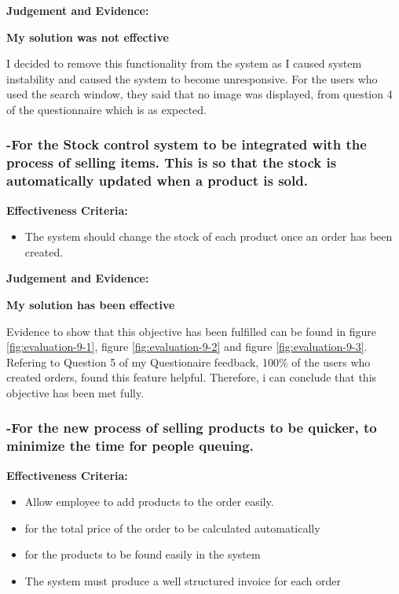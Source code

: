 \textbf{Judgement and Evidence:} \newline

\textbf{\large{My solution was not effective}}

I decided to remove this functionality from the system as I caused system instability and caused the system to become unresponsive. For the users who used the search window, they said that no image was displayed, from question 4 of the questionnaire which is as expected. 




\pagebreak
\subsubsection{-For the Stock control system to be integrated with the process of selling items. This is so that the stock is automatically updated when a product is sold.}
\label{stock-change-effectiveness}
\textbf{Effectiveness Criteria:}\newline
\begin{itemize}
	\item{The system should change the stock of each product once an order has been created.}
\end{itemize}

\textbf{Judgement and Evidence:} \newline

\textbf{\large{My solution has been effective}}

Evidence to show that this objective has been fulfilled can be found in figure \ref{fig:evaluation-9-1}, figure \ref{fig:evaluation-9-2} and figure \ref{fig:evaluation-9-3}. Refering to Question 5 of my Questionaire feedback, 100\% of the users who created orders, found this feature helpful. Therefore, i can conclude that this objective has been met fully.




\pagebreak
\subsubsection{-For the new process of selling products to be quicker, to minimize the time for people queuing.}

\textbf{Effectiveness Criteria:}\newline
\begin{itemize}
	\item{Allow employee to add products to the order easily.}
	\item{for the total price of the order to be calculated automatically}
	\item{for the products to be found easily in the system}
	\item{The system must produce a well structured invoice for each order}
\end{itemize}

